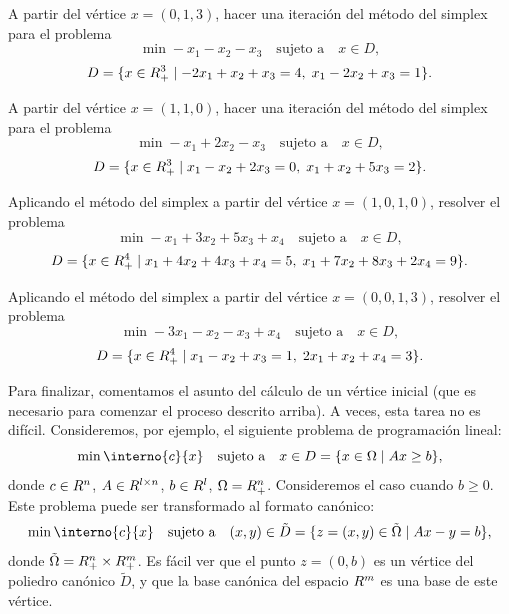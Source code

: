\begin{exercise}\label{v2:ejer:6.1.14}
    A partir del vértice $x = (0, 1, 3)$, hacer una iteración del método del simplex para el problema
    \[
        \min -x_1 - x_2 - x_3 \quad \text{sujeto a} \quad x \in D,
    \]
    \[
        D = \{ x \in R^3_+ \mid -2x_1 + x_2 + x_3 = 4, \; x_1 - 2x_2 + x_3 = 1 \}.
    \]
\end{exercise}

\begin{exercise}\label{v2:ejer:6.1.15}
    A partir del vértice $x = (1, 1, 0)$, hacer una iteración del método del simplex para el problema
    \[
        \min -x_1 + 2x_2 - x_3 \quad \text{sujeto a} \quad x \in D,
    \]
    \[
        D = \{ x \in R^3_+ \mid x_1 - x_2 + 2x_3 = 0, \; x_1 + x_2 + 5x_3 = 2 \}.
    \]
\end{exercise}

\begin{exercise}\label{v2:ejer:6.1.16}
    Aplicando el método del simplex a partir del vértice $x = (1, 0, 1, 0)$, resolver el problema
    \[
        \min -x_1 + 3x_2 + 5x_3 + x_4 \quad \text{sujeto a} \quad x \in D,
    \]
    \[
        D = \{ x \in R^4_+ \mid x_1 + 4x_2 + 4x_3 + x_4 = 5, \; x_1 + 7x_2 + 8x_3 + 2x_4 = 9 \}.
    \]
\end{exercise}

\begin{exercise}\label{v2:ejer:6.1.17}
    Aplicando el método del simplex a partir del vértice $x = (0, 0, 1, 3)$, resolver el problema
    \[
        \min -3x_1 - x_2 - x_3 + x_4 \quad \text{sujeto a} \quad x \in D,
    \]
    \[
        D = \{ x \in R^4_+ \mid x_1 - x_2 + x_3 = 1, \; 2x_1 + x_2 + x_4 = 3 \}.
    \]
\end{exercise}

Para finalizar, comentamos el asunto del cálculo de un vértice inicial (que es necesario para comenzar el proceso descrito arriba). A veces, esta tarea no es difícil. Consideremos, por ejemplo, el siguiente problema de programación lineal:
\[
    \min \interno{c}{x} \quad \text{sujeto a} \quad x \in D = \{ x \in \Omega \mid Ax \ge b \},
\]
donde $c \in R^n$, $A \in R^{l \times n}$, $b \in R^l$, $\Omega = R^n_+$. Consideremos el caso cuando $b \ge 0$. Este problema puede ser transformado al formato canónico:
\begin{equation}
    \min \interno{c}{x} \quad \text{sujeto a} \quad (x, y) \in \tilde{D} = \{ z = (x, y) \in \tilde{\Omega} \mid Ax - y = b \},
    \label{v2:eq:6.36}
\end{equation}
donde $\tilde{\Omega} = R^n_+ \times R^m_+$. Es fácil ver que el punto $z = (0, b)$ es un vértice del poliedro canónico $\tilde{D}$, y que la base canónica del espacio $R^m$ es una base de este vértice.

